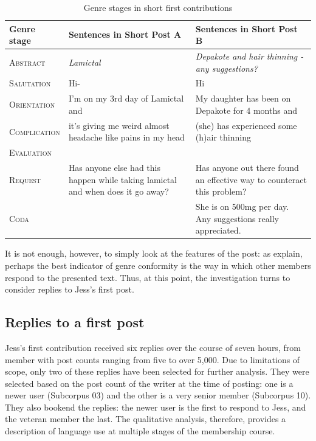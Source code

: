 \documentclass{article}
\begin{document}
{\begin{table}[htb]
\small\centering
\begin{tabularx}{\textwidth}{lXX}
\toprule
Genre stage  & Sentences in Short Post A  & Sentences in Short Post B \\ \midrule
\textsc{Abstract}     & \emph{Lamictal}  & \emph{Depakote and hair thinning - any suggestions?}  \\
\textsc{Salutation}   & Hi-                                                                              & Hi                                                                      \\
\textsc{Orientation}  & I'm on my 3rd day of Lamictal and                                                & My daughter has been on Depakote for 4 months and                       \\
\textsc{Complication} & it's giving me weird almost headache like pains in my head                       & (she) has experienced some (h)air thinning                              \\
\textsc{Evaluation}   & ~                                                                                & ~                                                                       \\
\textsc{Request }     & Has anyone else had this happen while taking lamictal and when does it go away? & Has anyone out there found an effective way to counteract this problem? \\
\textsc{Coda}         & ~                                                                                & She is on 500mg per day. Any suggestions really appreciated.            \\
\bottomrule
\end{tabularx}
\caption{Genre stages in short first contributions}
\label{tab:two-genre-stage-analyses}
\end{table}
%
It is not enough, however, to simply look at the features of the post: as \textcite{eggins_analysing_2004} explain, perhaps the best indicator of genre conformity is the way in which other members respond to the presented text. Thus, at this point, the investigation turns to consider replies to Jess's first post.

\subsection{Replies to a first post}

Jess's first contribution received six replies over the course of seven hours, from member with post counts ranging from five to over 5,000. Due to limitations of scope, only two of these replies have been selected for further analysis. They were selected based on the post count of the writer at the time of posting: one is a newer user (Subcorpus 03) and the other is a very senior member (Subcorpus 10). They also bookend the replies: the newer user is the first to respond to Jess, and the veteran member the last. The qualitative analysis, therefore, provides a description of language use at multiple stages of the membership course. %

}
\end{document}
